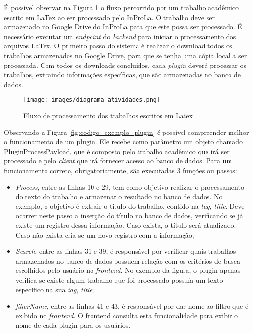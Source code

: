 \documentclass[12pt]{article}
\begin{document}
É possível observar na Figura \ref{fig:fluxograma_processamento} o fluxo percorrido por um trabalho acadêmico escrito em LaTex ao ser processado pelo InProLa. O trabalho deve ser armazenado no Google Drive do InProLa para que este possa ser processado. É necessário executar um \textit{endpoint} do \textit{backend} para iniciar o processamento dos arquivos LaTex. O primeiro passo do sistema é realizar o download todos os trabalhos armazenados no Google Drive, para que se tenha uma cópia local a ser processada. Com todos os downloads concluídos, cada \textit{plugin} deverá processar os trabalhos, extraindo informações específicas, que são armazenadas no banco de dados.

\begin{figure}[ht!]
\centering
\texttt{[image: images/diagrama\_atividades.png]}
\caption{Fluxo de processamento dos trabalhos escritos em Latex}
\label{fig:fluxograma_processamento}
\end{figure}

Observando a Figura \ref{fig:codigo_exemplo_plugin} é possível compreender melhor o funcionamento de um plugin. Ele recebe como parâmetro um objeto chamado PluginProcessPayload, que é composto pelo trabalho acadêmico que irá ser processado e pelo \textit{client} que irá fornecer acesso ao banco de dados. Para um funcionamento correto, obrigatoriamente, são executadas 3 funções ou passos:

\begin{itemize}
 \item \textit{Process}, entre as linhas 10 e 29, tem como objetivo realizar o processamento do texto do trabalho e armazenar o resultado no banco de dados. No exemplo, o objetivo é extrair o titulo do trabalho, contido na \textit{tag}, \textit{title}. Deve ocorrer neste passo a inserção do título no banco de dados, verificando se já existe um registro dessa informação. Caso exista, o título será atualizado. Caso não exista cria-se um novo registro com a informação;
 \item \textit{Search}, entre as linhas 31 e 39, é responsável por verificar quais trabalhos armazenados no banco de dados possuem relação com os critérios de busca escolhidos pelo usuário no \textit{frontend}. No exemplo da figura, o plugin apenas verifica se existe algum trabalho que foi processado possuía um texto específico na sua \textit{tag},  \textit{title};
 \item \textit{filterName}, entre as linhas 41 e 43, é responsável por dar nome ao filtro que é exibido no \textit{frontend}. O frontend consulta esta funcionalidade para exibir o nome de cada plugin para os usuários.
\end{itemize}
\end{document}
